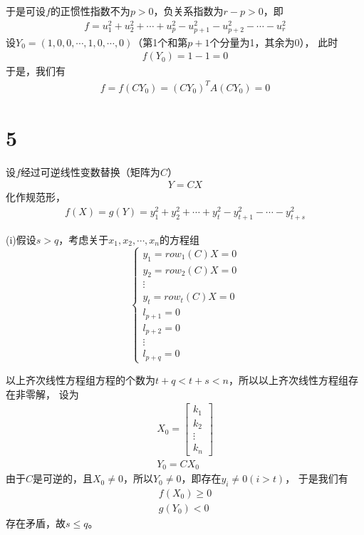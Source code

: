 \documentclass{article}
\begin{document}
于是可设$f$的正惯性指数不为$p > 0$，负关系指数为$r - p > 0$，即
\begin{align*}
  f = u_1^2 + u_2^2 + \cdots + u_p^2 - u_{p+1}^2 - u_{p+2}^2 - \cdots - u_r^2
\end{align*}
设$Y_0 = (1, 0, 0, \cdots, 1, 0, \cdots, 0)$（第1个和第$p+1$个分量为1，其余为0），
此时
\begin{align*}
  f(Y_0) = 1 - 1 = 0
\end{align*}
于是，我们有
\begin{align*}
  f = f(CY_0) = (CY_0)^T A (CY_0) = 0
\end{align*}

\section*{5}

设$f$经过可逆线性变数替换（矩阵为$C$）
\begin{align*}
  Y = C X
\end{align*}
化作规范形，
\begin{align*}
  f(X) = g(Y) = y_1^2 + y_2^2 + \cdots + y_t^2 - y_{t+1}^2 - \cdots - y_{t+s}^2
\end{align*}

(i)假设$s > q$，考虑关于$x_1, x_2, \cdots, x_n$的方程组
\begin{equation*}
  \begin{cases}
    y_1 = row_{1}(C) X = 0 \\
    y_2 = row_{2}(C) X = 0 \\
    \vdots                 \\
    y_t = row_{t}(C) X = 0 \\
    l_{p+1} = 0            \\
    l_{p+2} = 0            \\
    \vdots                 \\
    l_{p+q} = 0
  \end{cases}
\end{equation*}

以上齐次线性方程组方程的个数为$t + q < t + s < n$，所以以上齐次线性方程组存在非零解，
设为\begin{align*}
  X_0 = \begin{bmatrix}
          k_1    \\
          k_2    \\
          \vdots \\
          k_n
        \end{bmatrix} \\
  Y_0 = C X_0
\end{align*}
由于$C$是可逆的，且$X_0 \neq 0$，所以$Y_0 \neq 0$，即存在$y_i \neq 0 (i > t)$，
于是我们有
\begin{align*}
  f(X_0) \geq 0 \\
  g(Y_0) < 0
\end{align*}
存在矛盾，故$s \leq q$。
\end{document}

